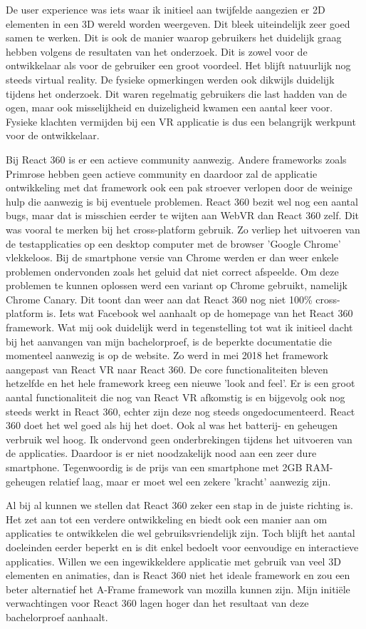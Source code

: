 De user experience was iets waar ik initieel aan twijfelde aangezien er 2D elementen in een 3D wereld worden weergeven. Dit bleek uiteindelijk zeer goed samen te werken. Dit is ook de manier waarop gebruikers het duidelijk graag hebben volgens de resultaten van het onderzoek. Dit is zowel voor de ontwikkelaar als voor de gebruiker een groot voordeel. Het blijft natuurlijk nog steeds virtual reality. De fysieke opmerkingen werden ook dikwijls duidelijk tijdens het onderzoek. Dit waren regelmatig gebruikers die last hadden van de ogen, maar ook misselijkheid en duizeligheid kwamen een aantal keer voor. Fysieke klachten vermijden bij een VR applicatie is dus een belangrijk werkpunt voor de ontwikkelaar.

Bij React 360 is er een actieve community aanwezig. Andere frameworks zoals Primrose hebben geen actieve community en daardoor zal de applicatie ontwikkeling met dat framework ook een pak stroever verlopen door de weinige hulp die aanwezig is bij eventuele problemen. React 360 bezit wel nog een aantal bugs, maar dat is misschien eerder te wijten aan WebVR dan React 360 zelf. Dit was vooral te merken bij het cross-platform gebruik. Zo verliep het uitvoeren van de testapplicaties op een desktop computer met de browser 'Google Chrome' vlekkeloos. Bij de smartphone versie van Chrome werden er dan weer enkele problemen ondervonden zoals het geluid dat niet correct afspeelde. Om deze problemen te kunnen oplossen werd een variant op Chrome gebruikt, namelijk Chrome Canary. Dit toont dan weer aan dat React 360 nog niet 100\% cross-platform is. Iets wat Facebook wel aanhaalt op de homepage van het React 360 framework. Wat mij ook duidelijk werd in tegenstelling tot wat ik initieel dacht bij het aanvangen van mijn bachelorproef, is de beperkte documentatie die momenteel aanwezig is op de website. Zo werd in mei 2018 het framework aangepast van React VR naar React 360. De core functionaliteiten bleven hetzelfde en het hele framework kreeg een nieuwe 'look and feel'. Er is een groot aantal functionaliteit die nog van React VR afkomstig is en bijgevolg ook nog steeds werkt in React 360, echter zijn deze nog steeds ongedocumenteerd. React 360 doet het wel goed als hij het doet. Ook al was het batterij- en geheugen verbruik wel hoog. Ik ondervond geen onderbrekingen tijdens het uitvoeren van de applicaties. Daardoor is er niet noodzakelijk nood aan een zeer dure smartphone. Tegenwoordig is de prijs van een smartphone met 2GB RAM-geheugen relatief laag, maar er moet wel een zekere 'kracht' aanwezig zijn.

Al bij al kunnen we stellen dat React 360 zeker een stap in de juiste richting is. Het zet aan tot een verdere ontwikkeling en biedt ook een manier aan om applicaties te ontwikkelen die wel gebruiksvriendelijk zijn. Toch blijft het aantal doeleinden eerder beperkt en is dit enkel bedoelt voor eenvoudige en interactieve applicaties. Willen we een ingewikkeldere applicatie met gebruik van veel 3D elementen en animaties, dan is React 360 niet het ideale framework en zou een beter alternatief het A-Frame framework van mozilla kunnen zijn. Mijn initiële verwachtingen voor React 360 lagen hoger dan het resultaat van deze bachelorproef aanhaalt.